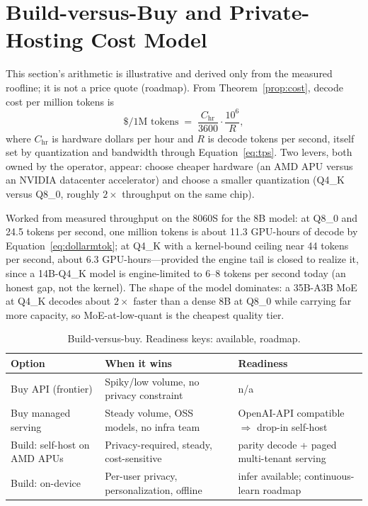 \documentclass[11pt]{article}
\begin{document}
\section{Build-versus-Buy and Private-Hosting Cost Model}
\label{sec:cost}

This section's arithmetic is illustrative and derived only from the measured roofline; it is not a price quote (roadmap). From Theorem~\ref{prop:cost}, decode cost per million tokens is
\begin{equation}
\label{eq:dollarmtok}
\text{\$/1M tokens} \;=\; \frac{C_{\mathrm{hr}}}{3600}\cdot\frac{10^6}{R},
\end{equation}
where $C_{\mathrm{hr}}$ is hardware dollars per hour and $R$ is decode tokens per second, itself set by quantization and bandwidth through Equation~\eqref{eq:tps}. Two levers, both owned by the operator, appear: choose cheaper hardware (an AMD APU versus an NVIDIA datacenter accelerator) and choose a smaller quantization (Q4\_K versus Q8\_0, roughly $2\times$ throughput on the same chip).

Worked from measured throughput on the 8060S for the 8B model: at Q8\_0 and 24.5 tokens per second, one million tokens is about 11.3 GPU-hours of decode by Equation~\eqref{eq:dollarmtok}; at Q4\_K with a kernel-bound ceiling near 44 tokens per second, about 6.3 GPU-hours---provided the engine tail is closed to realize it, since a 14B-Q4\_K model is engine-limited to 6--8 tokens per second today (an honest gap, not the kernel). The shape of the model dominates: a 35B-A3B MoE at Q4\_K decodes about $2\times$ faster than a dense 8B at Q8\_0 while carrying far more capacity, so MoE-at-low-quant is the cheapest quality tier.

\begin{table}[h]
\centering
\caption{Build-versus-buy. Readiness keys: available, roadmap.}
\label{tab:bvb}
\begin{tabular}{@{}p{2.3cm}p{2.0cm}p{2.5cm}@{}}
\toprule
\textbf{Option} & \textbf{When it wins} & \textbf{Readiness} \\
\midrule
Buy API (frontier) & Spiky/low volume, no privacy constraint & n/a \\
Buy managed serving & Steady volume, OSS models, no infra team & OpenAI-API compatible $\Rightarrow$ drop-in self-host \\
Build: self-host on AMD APUs & Privacy-required, steady, cost-sensitive & parity decode + paged multi-tenant serving \\
Build: on-device & Per-user privacy, personalization, offline & infer available; continuous-learn roadmap \\
\bottomrule
\end{tabular}
\end{table}
\end{document}
